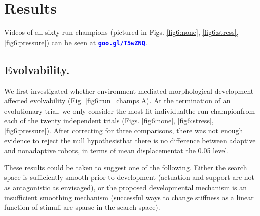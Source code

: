 \section{Results}
\label{sec6:results}


Videos of all sixty run champions (pictured in Figs. \ref{fig6:none}, \ref{fig6:stress}, \ref{fig6:pressure}) can be seen at
\href{https://www.youtube.com/playlist?list=PL7qssg0uLKTaFhaCRC0WviaGeOitOE8MR}{\textcolor{blue}{\textbf{\texttt{goo.gl/T5wZNQ}}}}.


\subsection*{Evolvability.}

We first investigated whether environment-mediated morphological development affected evolvability (Fig. \ref{fig6:run_champs}A).
At the termination of an evolutionary trial, we only consider the most fit individual{\textemdash}the run champion{\textemdash}from each of the twenty independent trials (Figs. \ref{fig6:none}, \ref{fig6:stress}, \ref{fig6:pressure}).
After correcting for three comparisons, there was not enough evidence to reject the null hypothesis{\textemdash}that there is no difference between adaptive and nonadaptive robots, in terms of mean displacement{\textemdash}at the 0.05 level.

These results could be taken to suggest one of the following. 
Either the search space is sufficiently smooth prior to development (actuation and support are not as antagonistic as envisaged), or the proposed developmental mechanism is an insufficient smoothing 
mechanism
(successful ways to change stiffness as a linear function of stimuli are sparse in the search space).


